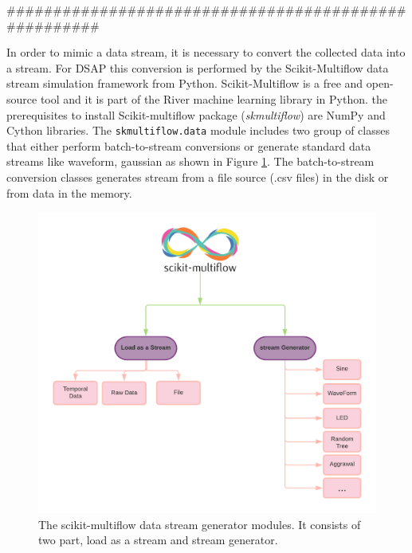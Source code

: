 \documentclass[../UNBThesis2.tex]{subfiles}
\begin{document}
#####################################################

In order to mimic a data stream, it is necessary to convert the collected data into a stream. For DSAP this conversion is performed by the Scikit-Multiflow data stream simulation framework from Python.  Scikit-Multiflow is a free and open-source tool \cite{montiel2018scikit} and it is part of the River machine learning library in Python. the prerequisites to install Scikit-multiflow package (\textit{skmultiflow}) are NumPy and Cython libraries. The \texttt{skmultiflow.data} module includes two group of classes that either perform batch-to-stream conversions or generate standard data streams like waveform, gaussian as shown in Figure \ref{sci}. The batch-to-stream conversion classes generates stream from a file source (.csv files) in the disk or from data in the memory.

\begin{figure}
    \centering
    \includegraphics[width = 11 cm]{image/Chapters/Chapter5/multiflow.png}
    \caption{The scikit-multiflow data stream generator modules. It consists of two part, load as a stream and stream generator.}
    \label{sci}
    \end{figure}
\end{document}
